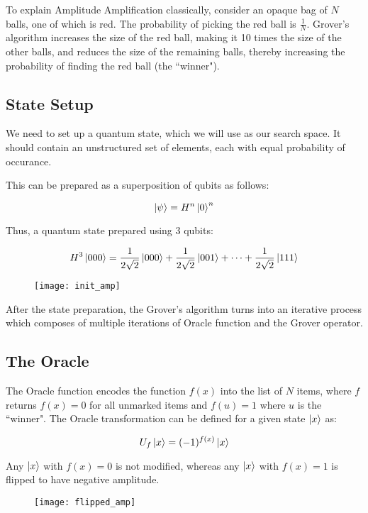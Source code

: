 \documentclass[a4paper]{article}
\begin{document}
To explain Amplitude Amplification classically, consider an opaque bag of $N$
balls, one of which is red. The probability of picking the red ball is
$\frac{1}{N}$.  Grover's algorithm increases the size of the red ball, making
it 10 times the size of the other balls, and reduces the size of the remaining
balls, thereby increasing the probability of finding the red ball (the ``winner").
\\
\par

\subsection{ State Setup }
We need to set up a quantum state, which we will use as our search space. It should 
contain an unstructured set of elements, each with equal probability of occurance. 
\\
\par
This can be prepared as a superposition of qubits as follows:

$$ \ket{\psi} = H^{n}\ket{0}^{n} $$

Thus, a quantum state prepared using 3 qubits:

\[
    H^{3}\ket{000} = \frac{1}{2\sqrt{2}}\ket{000} +
    \frac{1}{2\sqrt{2}}\ket{001} + \cdots + \frac{1}{2\sqrt{2}}\ket{111} 
\]

\begin{figure}[h]
\texttt{[image: init\_amp]}
\centering
\end{figure}

After the state preparation, the Grover’s algorithm turns into an iterative
process which composes of multiple iterations of Oracle function and the Grover
operator.
\pagebreak

\subsection{ The Oracle }
The Oracle function encodes the function $f(x)$ into the list of $N$ items, where
$f$ returns $f(x) = 0$ for all unmarked items and $f(u) = 1$ where $u$ is the 
``winner". The Oracle transformation can be defined for a given state $\ket{x}$ as:

$$ U_f\ket{x} = (-1)^{f(x)}\ket{x} $$
\par

Any $\ket{x}$ with $f(x) = 0$ is not modified, whereas any $\ket{x}$ with $f(x) = 1$
is flipped to have negative amplitude.

\begin{figure}[h]
\texttt{[image: flipped\_amp]}
\centering
\end{figure}
\end{document}
